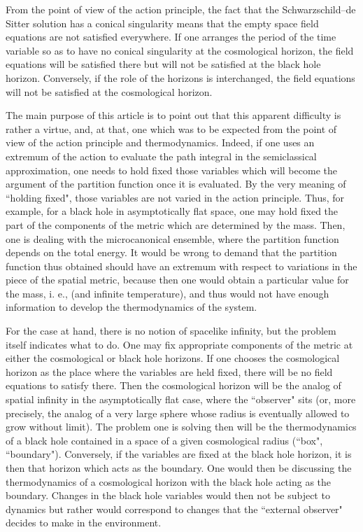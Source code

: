 \documentclass[a4paper,preprintnumbers,amsmath,amssymb]{revtex4}
\begin{document}
From the point of view of the action principle, the fact that the
Schwarzschild--de Sitter solution has a conical
singularity means that the empty space field equations are not satisfied
everywhere. If one arranges the period of the time variable so as to have no
conical singularity at the cosmological horizon, the field equations will be
satisfied there but will not be satisfied at the black hole horizon.
Conversely, if the role of the horizons is interchanged, the field equations
will not be satisfied at the cosmological horizon.

The main purpose of this article is to point out that this apparent
difficulty is rather a virtue, and, at  that,  one which was to be expected
from the point of view of the action principle and thermodynamics. Indeed, if one uses an
extremum of the action to evaluate the path integral in the semiclassical
approximation, one needs to hold fixed those variables which will become the
argument of the partition function once it is evaluated. By the very meaning
of ``holding fixed", those variables are not varied in the action
principle. Thus, for example, for a black hole in asymptotically flat space,
one may hold fixed the \coordHE{} part of the components of the metric
which are determined by the mass. Then, one is dealing with the
microcanonical ensemble, where the partition function depends on the total
energy. It would be wrong to demand that the partition function thus
obtained should have an extremum with respect to variations in the \coordHE{}
piece of the spatial metric, because then one would obtain a particular
value for the mass, i. e., \coordHE{} (and infinite temperature), and thus would not have enough information
to develop the thermodynamics of the system.

For the case at hand, there is no notion of spacelike infinity, but the
problem itself indicates what to do. One may fix appropriate components of
the metric at either the cosmological or black hole horizons. If one chooses
the cosmological horizon as the place where the variables are held fixed,
there will be no field equations to satisfy there.
Then the cosmological horizon will be the analog of
spatial infinity in the asymptotically flat case, where the ``observer" sits
(or, more precisely, the analog of a very large sphere whose radius is
eventually allowed to grow without limit). The problem one is solving then
will be the thermodynamics of a black hole contained in a space of a given
cosmological radius (``box", ``boundary"). Conversely, if the variables are fixed
at the black hole horizon, it is then that horizon which acts as the
boundary. One would then be discussing the thermodynamics of a cosmological
horizon with the black hole acting as the boundary. Changes in the black
hole variables would then not be subject  to dynamics but rather would
correspond to changes that the ``external observer" decides to make in the
environment.
\end{document}
